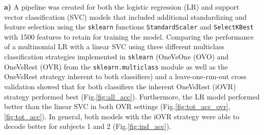 \documentclass[11pt, a4paper]{article}
\begin{document}
\noindent
\textbf{a)} A pipeline was created for both the logistic regression (LR) and support vector classification (SVC) models that included additional standardizing and feature selection using the \verb|sklearn| functions \verb|StandardScaler| and \verb|SelectKBest| with 1500 features to retain for training the model. Comparing the performance of a multinomial LR with a linear SVC using three different multiclass classification strategies implemented in \verb|sklearn| (OneVsOne (OVO) and OneVsRest (OVR) from the \verb|sklearn.multiclass| module as well as the OneVsRest strategy inherent to both classifiers) and a leave-one-run-out cross validation showed that for both classifiers the inherent OneVsRest (iOVR) strategy performed best (Fig.\ref{fig:all_acc}). Furthermore, the LR model performed better than the linear SVC in both OVR settings (Fig.\ref{fig:tot_acc_ovr},\ref{fig:tot_acc}). In general, both models with the iOVR strategy were able to decode better for subjects 1 and 2 (Fig.\ref{fig:ind_acc}).
\end{document}
